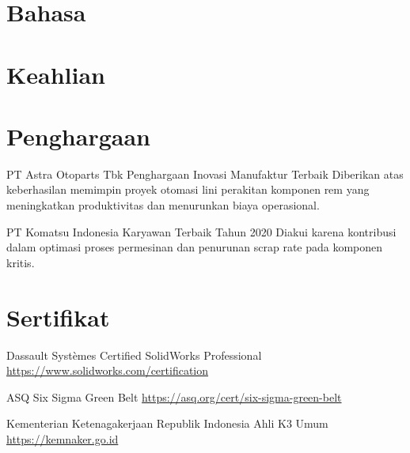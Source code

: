 \documentclass[a4paper, serif, 10pt]{moderncv}
\begin{document}
\section{Bahasa}

\section{Keahlian}

\section{Penghargaan}

        {PT Astra Otoparts Tbk}
        {Penghargaan Inovasi Manufaktur Terbaik}
        {}
        {}
        {Diberikan atas keberhasilan memimpin proyek otomasi lini perakitan komponen rem yang meningkatkan produktivitas dan menurunkan biaya operasional.}

        {PT Komatsu Indonesia}
        {Karyawan Terbaik Tahun 2020}
        {}
        {}
        {Diakui karena kontribusi dalam optimasi proses permesinan dan penurunan scrap rate pada komponen kritis.}
\section{Sertifikat}

        {Dassault Systèmes}
        {Certified SolidWorks Professional}
        {\url{https://www.solidworks.com/certification}}
        {}
        {}

        {ASQ}
        {Six Sigma Green Belt}
        {\url{https://asq.org/cert/six-sigma-green-belt}}
        {}
        {}

        {Kementerian Ketenagakerjaan Republik Indonesia}
        {Ahli K3 Umum}
        {\url{https://kemnaker.go.id}}
        {}
        {}
\end{document}
